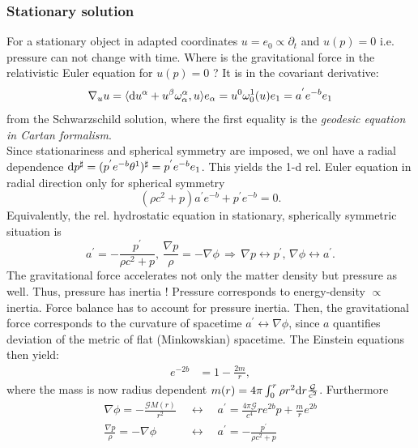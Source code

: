 \subsubsection{Stationary solution}
For a stationary object in adapted coordinates $u=e_0 \propto \partial_t$ and $u(p)=0$ i.e. pressure can not change with time. Where is the gravitational force in the relativistic Euler equation for $u(p)=0$ ? It is in the covariant derivative: 
\begin{equation}
\nabla_u u= \langle \mathrm{d} u^{\alpha} + u^{\beta} \omega^{\alpha}_{\alpha}, u \rangle e_{\alpha} = u^0 \omega^1_0(u) e_1 = a^{'} e^{-b} e_1
\end{equation}
from the Schwarzschild solution, where the first equality is the \emph{geodesic equation in Cartan formalism}.\\
Since stationariness and spherical symmetry are imposed, we onl have a radial dependence $\mathrm{d} p^{\sharp} = (p^{'} e^{-b} \theta^1)^{\sharp} = p^{'} e^{-b} e_1$. This yields the 1-d rel. Euler equation in radial direction only for spherical symmetry
\begin{equation}
(\rho c^2+p) a^{'} e^{-b} + p^{'} e^{-b} =0.
\end{equation}
Equivalently, the rel. hydrostatic equation in stationary, spherically symmetric situation is
\begin{equation}
a^{'}= - \frac{p^{'} }{\rho c^2+p}, \, \frac{\nabla p}{\rho} = - \nabla \phi \, \Rightarrow \, \nabla p \leftrightarrow p^{'} , \, \nabla \phi \leftrightarrow a^{'}.
\end{equation}
The gravitational force accelerates not only the matter density but pressure as well. Thus, pressure has inertia ! Pressure corresponds to energy-density $\propto$ inertia. Force balance has to account for pressure inertia. Then, the gravitational force corresponds to the curvature of spacetime $a^{'}  \leftrightarrow \nabla \phi$, since $a$ quantifies deviation of the metric of flat (Minkowskian) spacetime. The Einstein equations then yield:
\begin{align}
	e^{-2b} & = 1-\frac{2m}{r},
\end{align}
where the mass is now radius dependent $m(r)=4 \pi \int_0^r \rho r^2 \mathrm{d} r \frac{\mathcal{G}}{c^2}$.
Furthermore
\begin{align}
	\nabla \phi = - \frac{\mathcal{G} M(r)}{r^2} \;&\leftrightarrow \quad a^{'} = \frac{4 \pi \mathcal{G}}{c^4} r e^{2b} p + \frac{m}{r} e^{2b} \\
	\frac{\nabla p}{\rho}= - \nabla \phi \; &\leftrightarrow \quad    a^{'}= -\frac{p^{'}}{\rho c^2+p}
\end{align}
